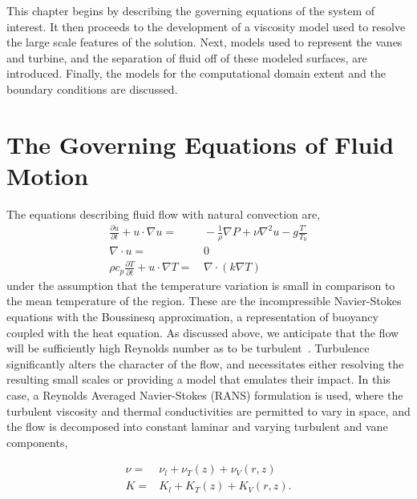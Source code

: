 This chapter begins by describing the governing equations of the system
of interest. It then proceeds to the development of a viscosity model
used to resolve the large scale features of the solution. Next, models
used to represent the vanes and turbine, and the separation of
fluid off of these modeled surfaces, are introduced.  Finally, the
models for the computational domain extent and the boundary conditions
are discussed. 


\section{The Governing Equations of Fluid Motion}
\label{sub_sec:ns_en}
%
%

The equations describing fluid flow with natural convection are,
\begin{align}
  \frac{\partial u}{\partial t} + u \cdot \nabla u =& \,
  -\frac{1}{\rho}\nabla P + \nu \nabla^2 u - g \frac{T'}{T_0}\\
  \nabla \cdot u =& \, 0 \\
  \rho c_p \frac{\partial T}{\partial t} + u \cdot \nabla T =& \, \nabla
 \cdot ( k \nabla T)
\end{align} 
under the assumption that the temperature variation is small in
comparison to the mean temperature of the region. These are the
incompressible Navier-Stokes equations with the Boussinesq
approximation\cite{boussinesq2010théorie}, a representation of buoyancy
coupled with the heat equation.   
%
%
%
As discussed above, we anticipate that the flow will be sufficiently
high Reynolds number as to be
turbulent~\cite{Reynolds01011883}. Turbulence significantly alters the
character of the flow,  
and necessitates either resolving the resulting small scales or
providing a model that emulates their impact. In this case, a
Reynolds Averaged Navier-Stokes (RANS) formulation is used, where the 
turbulent viscosity and thermal conductivities are permitted to vary in
space, and the flow is decomposed into constant laminar and varying
turbulent and vane components,  

\begin{eqnarray*}
 \nu =& \nu_{l} + \nu_{T}(z) + \nu_{V}(r,z) \\
 K =& K_{l} + K_{T}(z) + K_{V}(r,z).
\end{eqnarray*}

